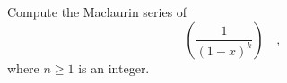 \label{problemMaclaurin 1/(1-x)^k}
Compute the Maclaurin series of 
\[
\left(\frac{1}{(1-x)^k}\right)\quad ,
\]
where $n\geq 1$ is an integer. 